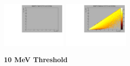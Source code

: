 \begin{center}
  \includegraphics[width=0.245\textwidth]{plots/response_matrix/Total_FHC_CCOther_null.pdf}
  \includegraphics[width=0.245\textwidth]{plots/response_matrix/Hadrons_FHC_CCOther_null.pdf}

\end{center}

\textbf{10 MeV Threshold}

